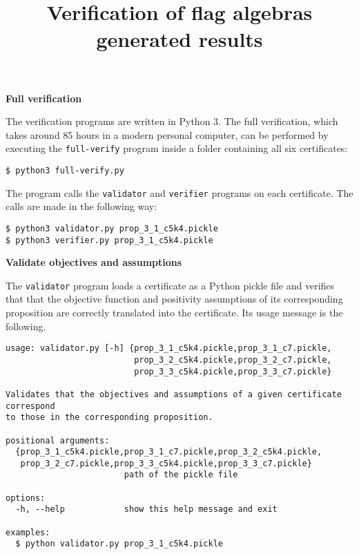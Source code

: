 \documentclass[11pt,a4paper,reqno]{amsart}
\begin{document}
\title[Verification of flag algebras generated results]{Verification of flag algebras generated results}

\maketitle

\textbf{\large Full verification}

The verification programs are written in Python 3. The full verification, which takes
around 85 hours in a modern personal computer, can be performed by executing the
\verb|full-verify| program inside a folder containing all six certificates:

\begin{Verbatim}[frame=single, fontsize=\small]
$ python3 full-verify.py
\end{Verbatim}

The program calls the \verb|validator| and \verb|verifier| programs on each
certificate. The calls are made in the following way:

\begin{Verbatim}[frame=single, fontsize=\small]
$ python3 validator.py prop_3_1_c5k4.pickle
$ python3 verifier.py prop_3_1_c5k4.pickle
\end{Verbatim}

\textbf{\large Validate objectives and assumptions}

The \verb|validator| program loads a certificate as a Python pickle file and verifies
that that the objective function and positivity assumptions of its corresponding
proposition are correctly translated into the certificate. Its usage message is the
following.

\begin{Verbatim}[frame=single, fontsize=\small]
usage: validator.py [-h] {prop_3_1_c5k4.pickle,prop_3_1_c7.pickle,
                          prop_3_2_c5k4.pickle,prop_3_2_c7.pickle,
                          prop_3_3_c5k4.pickle,prop_3_3_c7.pickle}

Validates that the objectives and assumptions of a given certificate correspond
to those in the corresponding proposition.

positional arguments:
  {prop_3_1_c5k4.pickle,prop_3_1_c7.pickle,prop_3_2_c5k4.pickle,
   prop_3_2_c7.pickle,prop_3_3_c5k4.pickle,prop_3_3_c7.pickle}
                        path of the pickle file

options:
  -h, --help            show this help message and exit

examples:
  $ python validator.py prop_3_1_c5k4.pickle
\end{Verbatim}
\end{document}
